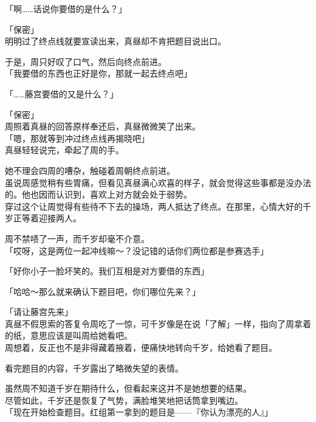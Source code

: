 「啊……话说你要借的是什么？」

「保密」\\

明明过了终点线就要宣读出来，真昼却不肯把题目说出口。

于是，周只好叹了口气，然后向终点前进。\\

「我要借的东西也正好是你，那就一起去终点吧」

「……藤宫要借的又是什么？」

「保密」\\

周照着真昼的回答原样奉还后，真昼微微笑了出来。\\

「嗯，那就等到冲过终点线再揭晓吧」\\

真昼轻轻说完，牵起了周的手。

她不理会四周的嘈杂，触碰着周朝终点前进。\\

虽说周感觉稍有些胃痛，但看见真昼满心欢喜的样子，就会觉得这些事都是没办法的。他也因而认识到，喜欢上对方就会处于弱势。\\

穿过这个让周觉得有些待不下去的操场，两人抵达了终点。在那里，心情大好的千岁正等着迎接两人。

周不禁啧了一声，而千岁却毫不介意。\\

「哎呀，这是两位一起冲线嘛～？没记错的话你们两位都是参赛选手」

「好你小子一脸坏笑的。我们互相是对方要借的东西」

「哈哈～那么就来确认下题目吧，你们哪位先来？」

「请让藤宫先来」\\

真昼不假思索的答复令周吃了一惊，可千岁像是在说「了解」一样，指向了周拿着的纸，意思应该是叫周给她看吧。\\

周想着，反正也不是非得藏着掖着，便痛快地转向千岁，给她看了题目。

看完题目的内容，千岁露出了略微失望的表情。

虽然周不知道千岁在期待什么，但看起来这并不是她想要的结果。\\

尽管如此，千岁还是恢复了气势，满脸堆笑地把话筒拿到嘴边。\\

「现在开始检查题目。红组第一拿到的题目是——『你认为漂亮的人』」\\

